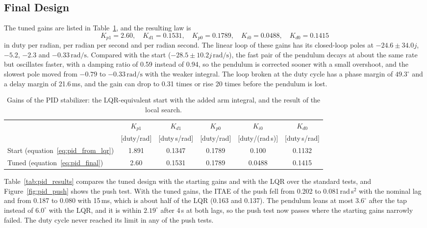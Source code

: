 \documentclass[a4paper,11pt]{article}
\begin{document}
\subsection{Final Design}
\label{sec:pid_final}
The tuned gains are listed in Table~\ref{tab:pid_gains}, and the resulting law is
\begin{equation}
  \boxed{K_{p1} = 2.60,\quad K_{d1} = 0.1531,\quad K_{p0} = 0.1789,\quad K_{i0} = 0.0488,\quad K_{d0} = 0.1415}
  \label{eq:pid_final}
\end{equation}
in duty per radian, per radian per second and per radian second. The linear loop of these gains has its closed-loop poles at $-24.6 \pm 34.0j$, $-5.2$, $-2.3$ and $-0.33\,\mathrm{rad/s}$. Compared with the start ($-28.5 \pm 10.2j\,\mathrm{rad/s}$), the fast pair of the pendulum decays at about the same rate but oscillates faster, with a damping ratio of 0.59 instead of 0.94, so the pendulum is corrected sooner with a small overshoot, and the slowest pole moved from $-0.79$ to $-0.33\,\mathrm{rad/s}$ with the weaker integral. The loop broken at the duty cycle has a phase margin of $49.3^\circ$ and a delay margin of 21.6\,ms, and the gain can drop to 0.31 times or rise 20 times before the pendulum is lost.

\begin{table}[htbp]
\centering
\caption{Gains of the PID stabilizer: the LQR-equivalent start with the added arm integral, and the result of the local search.}
\label{tab:pid_gains}
\small
\begin{tabular}{@{}lccccc@{}}
\toprule
 & $K_{p1}$ & $K_{d1}$ & $K_{p0}$ & $K_{i0}$ & $K_{d0}$ \\
 & [duty/rad] & [duty$\,$s/rad] & [duty/rad] & [duty/(rad$\,$s)] & [duty$\,$s/rad] \\
\midrule
Start (equation~\ref{eq:pid_from_lqr}) & 1.891 & 0.1347 & 0.1789 & 0.100 & 0.1132 \\
Tuned (equation~\ref{eq:pid_final}) & 2.60 & 0.1531 & 0.1789 & 0.0488 & 0.1415 \\
\bottomrule
\end{tabular}
\end{table}

Table~\ref{tab:pid_results} compares the tuned design with the starting gains and with the LQR over the standard tests, and Figure~\ref{fig:pid_push} shows the push test. With the tuned gains, the ITAE of the push fell from 0.202 to 0.081\,rad\,s$^2$ with the nominal lag and from 0.187 to 0.080 with 15\,ms, which is about half of the LQR (0.163 and 0.137). The pendulum leans at most $3.6^\circ$ after the tap instead of $6.0^\circ$ with the LQR, and it is within $2.19^\circ$ after 4\,s at both lags, so the push test now passes where the starting gains narrowly failed. The duty cycle never reached its limit in any of the push tests.
\end{document}
